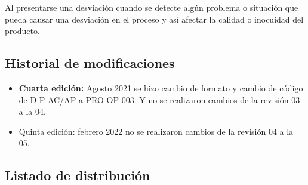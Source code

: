 Al presentarse una desviación cuando se detecte algún problema o situación que pueda causar una desviación en el proceso y así afectar la calidad o inocuidad del producto.

\subsection{Historial de modificaciones}

\begin{itemize}
	\item \textbf{Cuarta edición:} Agosto 2021 se hizo cambio de formato y cambio de código de D-P-AC/AP a PRO-OP-003. Y no se realizaron cambios de la revisión 03 a la 04.
	\item Quinta edición: febrero 2022 no se realizaron cambios de la revisión 04 a la 05.
\end{itemize}

\subsection{Listado de distribución}


